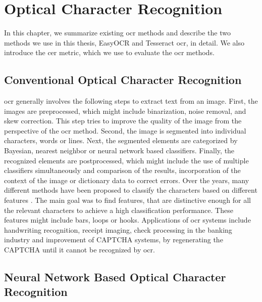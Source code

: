 \chapter{Optical Character Recognition}
\label{chap:ocr}

In this chapter, we summarize existing \gls{ocr} methods and describe the two methods we use in this thesis, EasyOCR and Tesseract \gls{ocr}, in detail.
We also introduce the \gls{cer} metric, which we use to evaluate the \gls{ocr} methods.

\section{Conventional Optical Character Recognition}

\Gls{ocr} \cite{ocr_survey_2017} generally involves the following steps to extract text from an image.
First, the images are preprocessed, which might include binarization, noise removal, and skew correction.
This step tries to improve the quality of the image from the perspective of the \gls{ocr} method.
Second, the image is segmented into individual characters, words or lines.
Next, the segmented elements are categorized by Bayesian, nearest neighbor or neural network based classifiers.
Finally, the recognized elements are postprocessed, which might include the use of multiple classifiers simultaneously and comparison of the results, incorporation of the context of the image or dictionary data to correct errors.
Over the years, many different methods have been proposed to classify the characters based on different features \cite{ocr_appl_survey_2014, ocr_appl_survey_2016}.
The main goal was to find features, that are distinctive enough for all the relevant characters to achieve a high classification performance.
These features might include bars, loops or hooks.
Applications of \gls{ocr} systems include handwriting recognition, receipt imaging, check processing in the banking industry and improvement of CAPTCHA systems, by regenerating the CAPTCHA until it cannot be recognized by \gls{ocr}.


\section{Neural Network Based Optical Character Recognition}


